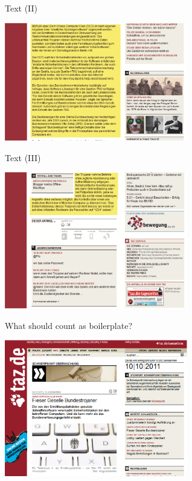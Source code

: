 \begin{frame}
  {Text (II)}
  \begin{center}
    \includegraphics[width=8cm]{graphicswcc/webseite2}
  \end{center}
\end{frame}

\begin{frame}
  {Text (III)}
  \begin{center}
    \includegraphics[width=8cm]{graphicswcc/webseite3}
  \end{center}
\end{frame}




\begin{frame}
  {What should count as boilerplate? }
  \begin{center}
    \includegraphics[width=8cm]{graphicswcc/webseite}
  \end{center}
\end{frame}

